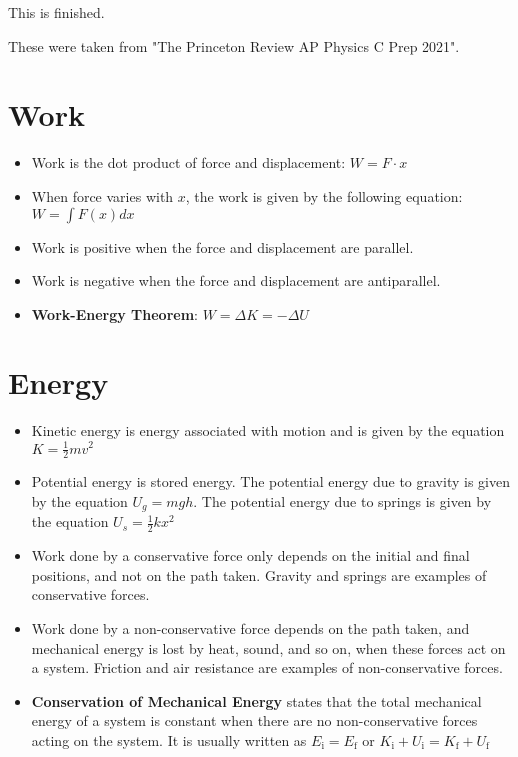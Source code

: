\documentclass{article}
\begin{document}
\begin{finished}
    This is finished.
\end{finished}

\begin{note}
    These were taken from "The Princeton Review AP Physics C Prep 2021". 
\end{note}

\section{Work}
\begin{itemize}
    \item Work is the dot product of force and displacement: $W = F \cdot x$
    \item When force varies with $x$, the work is given by the following equation: $W = \int F(x) dx$
    \item Work is positive when the force and displacement are parallel.
    \item Work is negative when the force and displacement are antiparallel.
    \item \textbf{Work-Energy Theorem}: $W = \Delta K = -\Delta U$
\end{itemize}

\section{Energy}
\begin{itemize}
    \item Kinetic energy is energy associated with motion and is given by the equation $K = \frac{1}{2}mv^{2}$
    \item Potential energy is stored energy. The potential energy due to gravity is given by the equation $U_{g} = mgh$. The potential energy due to springs is given by the equation $U_{s}=\frac{1}{2}kx^{2}$
    \item Work done by a conservative force only depends on the initial and final positions, and not on the path taken. Gravity and springs are examples of conservative forces.
    \item Work done by a non-conservative force depends on the path taken, and mechanical energy is lost by heat, sound, and so on, when these forces act on a system. Friction and air resistance are examples of non-conservative forces.
    \item \textbf{Conservation of Mechanical Energy} states that the total mechanical energy of a system is constant when there are no non-conservative forces acting on the system. It is usually written as $E_{\text{i}} = E_{\text{f}}$ or $K_{\text{i}} + U_{\text{i}} = K_{\text{f}} + U_{\text{f}}$
\end{itemize}
\end{document}

